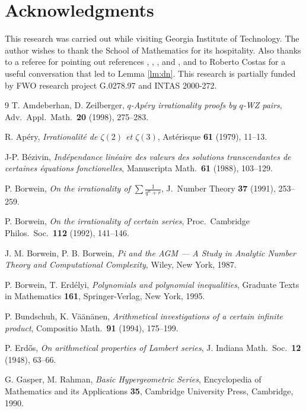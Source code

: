 \documentclass[12pt]{article}
\begin{document}
             
                              
   
       

\section*{Acknowledgments}
This research was carried out while visiting Georgia
Institute of Technology. The author wishes to thank the School of
Mathematics for its hospitality. Also thanks to a referee for
pointing out references \cite{Be}, \cite{BV}, \cite{Ge}, and \cite{MV},
and to Roberto Costas for a useful conversation that led to Lemma
\ref{lm:dn}.  This research is partially funded by
FWO research project G.0278.97 and INTAS 2000-272.

 
\begin{thebibliography}{9}
 T. Amdeberhan, D. Zeilberger, 
\textit{$q$-Ap\'ery irrationality proofs by $q$-WZ pairs},
Adv.\ Appl.\ Math.\ \textbf{20} (1998), 275--283.

 R. Ap\'ery, 
\textit{Irrationalit\'e de $\zeta(2)$ et $\zeta(3)$},
Ast\'erisque \textbf{61} (1979), 11--13.

 J-P. B\'ezivin,
\textit{Ind\'ependance lin\'eaire des valeurs des solutions transcendantes
de certaines \'equations fonctionelles},
Manuscripta Math.\ \textbf{61} (1988), 103--129.

 P. Borwein, 
\textit{On the irrationality of $\sum \frac{1}{q^n+r}$},
J.\ Number Theory \textbf{37} (1991), 253--259.

 P. Borwein,
\textit{On the irrationality of certain series},
Proc.\ Cambridge Philos.\ Soc.\ \textbf{112} (1992), 141--146.

 J. M. Borwein, P. B. Borwein,
\textit{Pi and the AGM --- A Study in Analytic Number Theory and
Computational Complexity}, Wiley, New York, 1987. 

 P. Borwein, T. Erd\'elyi,
\textit{Polynomials and polynomial inequalities},
Graduate Texts in Mathematics \textbf{161},
Springer-Verlag, New York, 1995.

 P. Bundschuh, K. V\"a\"an\"anen,
\textit{Arithmetical investigations of a certain infinite product},
Compositio Math.\ \textbf{91} (1994), 175--199.

 P. Erd\H{o}s,
\textit{On arithmetical properties of Lambert series},
J. Indiana Math.\ Soc.\ \textbf{12} (1948), 63--66.

 G. Gasper, M. Rahman,
\textit{Basic Hypergeometric Series},
Encyclopedia of Mathematics and its Applications \textbf{35},
Cambridge University Press, Cambridge, 1990.


\end{thebibliography}
\end{document}
